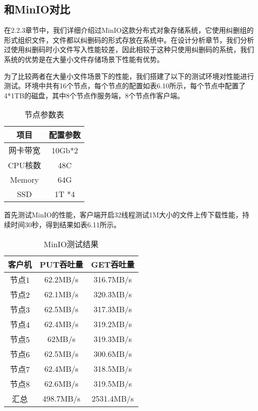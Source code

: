 \subsection{和MinIO对比}%
在2.2.3章节中，我们详细介绍过MinIO这款分布式对象存储系统，它使用纠删组的形式组织文件，文件都以纠删码的形式存放在系统中。在设计分析章节，我们分析过使用纠删码时小文件写入性能较差，因此相较于这种只使用纠删码的系统，我们系统的优势是在大量小文件存储场景下性能有优势。

为了比较两者在大量小文件场景下的性能，我们搭建了以下的测试环境对性能进行测试。环境中共有16个节点，每个节点的配置如表6.10所示，每个节点中配置了4*1TB的磁盘，其中8个节点作服务端，8个节点作客户端。

\begin{table}[h]
    \centering
    \caption{节点参数表}
    \begin{tabular}{cc}
      \toprule
      项目   & 配置参数   \\
      \midrule
      网卡带宽 & 10Gb*2  \\
      CPU核数  & 48C     \\
      Memory  & 64G      \\
      SSD     & 1T *4   \\
      \bottomrule
    \end{tabular}
\end{table}

首先测试MinIO的性能，客户端开启32线程测试1M大小的文件上传下载性能，持续时间30秒，得到结果如表6.11所示。

\begin{table}[h]
    \centering
    \caption{MinIO测试结果}
    \begin{tabular}{ccc}
      \toprule
      客户机   & PUT吞吐量  & GET吞吐量 \\
      \midrule
      节点1  & 62.2MB/s  & 316.7MB/s \\
      节点2  & 62.1MB/s  & 320.3MB/s \\
      节点3  & 62.5MB/s  & 317.3MB/s \\
      节点4  & 62.4MB/s  & 319.2MB/s \\
      节点5  & 62MB/s    & 319.3MB/s \\
      节点6  & 62.5MB/s  & 300.6MB/s \\
      节点7  & 62.4MB/s  & 318.5MB/s \\
      节点8  & 62.6MB/s  & 319.5MB/s \\
      汇总   & 498.7MB/s & 2531.4MB/s \\
      \bottomrule
    \end{tabular}
\end{table}

